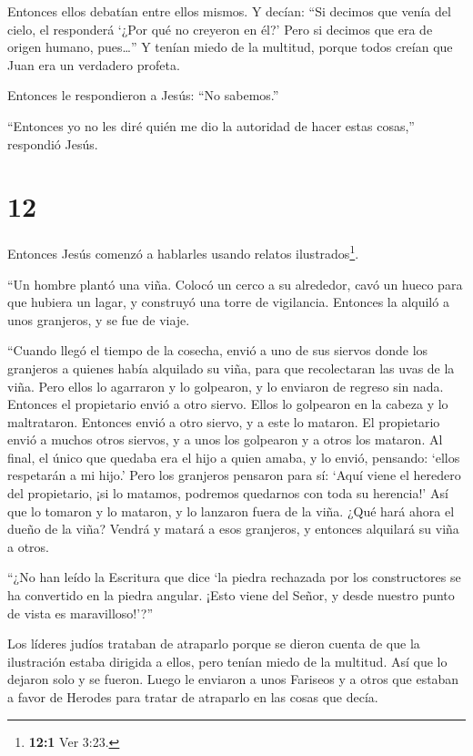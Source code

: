  Entonces ellos debatían entre ellos mismos. Y decían: ``Si
decimos que venía del cielo, el responderá `¿Por qué no creyeron en él?'
 Pero si decimos que era de origen humano, pues\ldots{}'' Y
tenían miedo de la multitud, porque todos creían que Juan era un
verdadero profeta.

 Entonces le respondieron a Jesús: ``No sabemos.''

``Entonces yo no les diré quién me dio la autoridad de hacer estas
cosas,'' respondió Jesús.

\hypertarget{section-11}{%
\section{12}\label{section-11}}

 Entonces Jesús comenzó a hablarles usando relatos
ilustrados\footnote{\textbf{12:1} Ver 3:23.}.

``Un hombre plantó una viña. Colocó un cerco a su alrededor, cavó un
hueco para que hubiera un lagar, y construyó una torre de vigilancia.
Entonces la alquiló a unos granjeros, y se fue de viaje.

 ``Cuando llegó el tiempo de la cosecha, envió a uno de sus
siervos donde los granjeros a quienes había alquilado su viña, para que
recolectaran las uvas de la viña.  Pero ellos lo agarraron y
lo golpearon, y lo enviaron de regreso sin nada.  Entonces
el propietario envió a otro siervo. Ellos lo golpearon en la cabeza y lo
maltrataron.  Entonces envió a otro siervo, y a este lo
mataron. El propietario envió a muchos otros siervos, y a unos los
golpearon y a otros los mataron.  Al final, el único que
quedaba era el hijo a quien amaba, y lo envió, pensando: `ellos
respetarán a mi hijo.'  Pero los granjeros pensaron para sí:
`Aquí viene el heredero del propietario, ¡si lo matamos, podremos
quedarnos con toda su herencia!'  Así que lo tomaron y lo
mataron, y lo lanzaron fuera de la viña.  ¿Qué hará ahora el
dueño de la viña? Vendrá y matará a esos granjeros, y entonces alquilará
su viña a otros.

 ``¿No han leído la Escritura que dice `la piedra rechazada
por los constructores se ha convertido en la piedra angular.
 ¡Esto viene del Señor, y desde nuestro punto de vista es
maravilloso!'?''

 Los líderes judíos trataban de atraparlo porque se dieron
cuenta de que la ilustración estaba dirigida a ellos, pero tenían miedo
de la multitud. Así que lo dejaron solo y se fueron.  Luego
le enviaron a unos Fariseos y a otros que estaban a favor de Herodes
para tratar de atraparlo en las cosas que decía.

